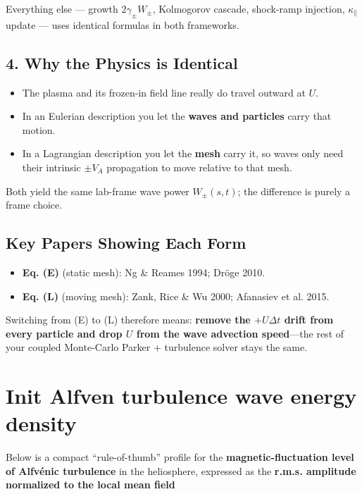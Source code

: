 \smallskip

Everything else — growth $2\gamma_\pm W_\pm$, Kolmogorov cascade, shock-ramp injection, $\kappa_\parallel$ update — uses identical formulas in both frameworks.

\subsection*{4. Why the Physics is Identical}

\begin{itemize}
\item The plasma and its frozen-in field line really do travel outward at $U$.
\item In an Eulerian description you let the \textbf{waves and particles} carry that motion.
\item In a Lagrangian description you let the \textbf{mesh} carry it, so waves only need their intrinsic $\pm V_A$ propagation to move relative to that mesh.
\end{itemize}

Both yield the same lab-frame wave power $W_\pm(s,t)$; the difference is purely a frame choice.

\subsection*{Key Papers Showing Each Form}

\begin{itemize}
\item \textbf{Eq. (E)} (static mesh): Ng \& Reames 1994; Dröge 2010.
\item \textbf{Eq. (L)} (moving mesh): Zank, Rice \& Wu 2000; Afanasiev et al. 2015.
\end{itemize}

\bigskip

Switching from (E) to (L) therefore means: \textbf{remove the $+U\Delta t$ drift from every particle and drop $U$ from the wave advection speed}—the rest of your coupled Monte-Carlo Parker + turbulence solver stays the same.


\section{Init Alfven turbulence wave energy density}

Below is a compact “rule-of-thumb” profile for the \textbf{magnetic-fluctuation level of Alfvénic turbulence} in the heliosphere, expressed as the \textbf{r.m.s. amplitude normalized to the local mean field}

